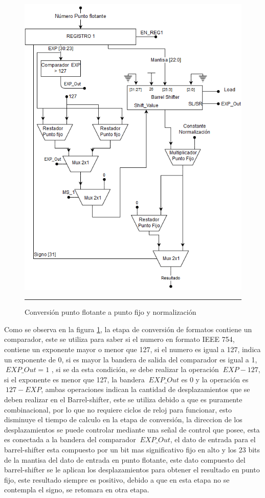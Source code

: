   
  \begin{figure}[H]
  \centering
    \includegraphics[scale=0.7]{./NORMALIZADOR.png}
    \rule{35em}{0.5pt}
  \caption[Normalizador]{Conversión punto flotante a punto fijo y normalización  }
  \label{fig:NORM}
\end{figure} 

Como se observa en la figura \ref{fig:NORM}, la etapa de conversión de formatos contiene un comparador, este se utiliza para saber si el numero en formato IEEE 754, contiene un exponente mayor o menor que 127, si el numero es igual a 127, indica un exponente de 0, si es mayor la bandera de salida del comparador es igual a 1, $\ EXP\_Out = 1$ , si se da esta condición, se debe realizar la operación $\ EXP - 127$, si el exponente es menor que 127, la bandera $\ EXP\_Out$  es 0 y la operación es $\ 127 - EXP$, ambas operaciones indican la cantidad de desplazamientos que se deben realizar en el Barrel-shifter, este se utiliza debido a que es puramente combinacional, por lo que no requiere ciclos de reloj para funcionar, esto disminuye el tiempo de calculo en la etapa de conversión, la direccion de los desplazamientos se puede controlar mediante una señal de control que posee, esta es conectada a la bandera del comparador  $\ EXP\_Out $, el dato de entrada para el barrel-shifter esta compuesto por un bit mas significativo fijo en alto y los 23 bits de la mantisa del dato de entrada en punto flotante, este dato compuesto del barrel-shifter se le aplican los desplazamientos para obtener el resultado en punto fijo, este resultado siempre es positivo, debido a que en esta etapa no se contempla el signo, se retomara en otra etapa.    

